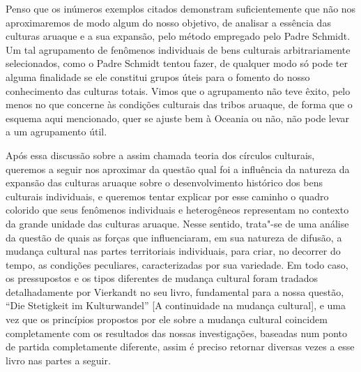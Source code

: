 Penso que os inúmeros exemplos citados demonstram suficientemente que
não nos aproximaremos de modo algum do nosso objetivo, de analisar a
essência das culturas aruaque e a sua expansão, pelo método empregado
pelo Padre Schmidt. Um tal agrupamento de fenômenos individuais de bens
culturais arbitrariamente selecionados, como o Padre Schmidt tentou
fazer, de qualquer modo só pode ter alguma finalidade se ele constitui
grupos úteis para o fomento do nosso conhecimento das culturas totais.
Vimos que o agrupamento não teve êxito, pelo menos no que concerne às
condições culturais das tribos aruaque, de forma que o esquema aqui
mencionado, quer se ajuste bem à Oceania ou não, não pode levar a um
agrupamento útil.

Após essa discussão sobre a assim chamada teoria dos círculos
culturais, queremos a seguir nos aproximar da questão qual foi a
influência da natureza da expansão das culturas aruaque sobre o
desenvolvimento histórico dos bens culturais individuais, e queremos
tentar explicar por esse caminho o quadro colorido que seus fenômenos
individuais e heterogêneos representam no contexto da grande unidade
das culturas aruaque. Nesse sentido, trata"-se de uma análise da questão
de quais as forças que influenciaram, em sua natureza de difusão, a
mudança cultural nas partes territoriais individuais, para criar, no
decorrer do tempo, as condições peculiares, caracterizadas por sua
variedade. Em todo caso, os pressupostos e os tipos diferentes de
mudança cultural foram tradados detalhadamente por Vierkandt no seu
livro, fundamental para a nossa questão, ``Die Stetigkeit im
Kulturwandel'' {[}A continuidade na mudança cultural{]}, e uma vez que
os princípios propostos por ele sobre a mudança cultural coincidem
completamente com os resultados das nossas investigações, baseadas num
ponto de partida completamente diferente, assim é preciso retornar
diversas vezes a esse livro nas partes a seguir.

